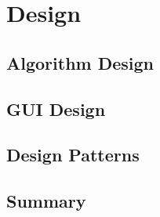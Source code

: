 \chapter{Design}

\section{Algorithm Design}
\label{AlgDes}

\section{GUI Design}
\label{GUIDes}

\section{Design Patterns}
\label{DesPatterns}

\section{Summary}
\label{DesSummary}

